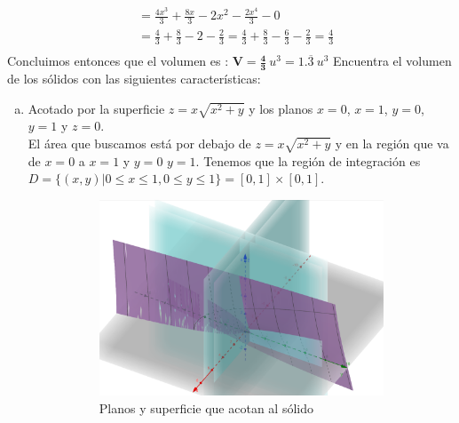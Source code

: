 \documentclass[12pt]{exam}
\begin{document}
\begin{questions}
\begin{align*}
      &= \frac{4x^3}{3}+ \frac{8x}{3}-2x^2-\frac{2x^4}{3} -0 \\
      &= \frac{4}{3}+ \frac{8}{3}-2-\frac{2}{3}=\frac{4}{3}+ \frac{8}{3}-\frac{6}{3}-\frac{2}{3} =\frac{4}{3} \\
    \end{align*}
Concluimos entonces que el volumen es : $ \boldsymbol{V = \frac{4}{3}} ~u^3 = 1.\overline{3}~u^3 $
     \question
       Encuentra el volumen de los sólidos con las siguientes características:
     \begin{enumerate}[a)]
     \item Acotado por la superficie $z=x\sqrt{x^2+y}$ y los planos $x=0$, $x=1$, $y=0$, $y=1$ y $z=0$.\\
       El área que buscamos está por debajo de $z=x\sqrt{x^2+y}$ y en la región que va de $x=0$ a $x=1$ y $y=0$ $y=1$.  Tenemos que la región de integración es $D=\{(x,y)|0 \leq x \leq 1, 0 \leq y \leq 1 \} =[0,1]\times[0,1]$.\\
      \begin{figure}[H]
    \centering
    \begin{subfigure}[b]{0.4\textwidth}
        \centering
        \includegraphics[width=\textwidth]{./img/i1e5.png}
        \caption{Planos y superficie que acotan al sólido}
        \label{fig:mapa1}
    \end{subfigure}
    \hfill
    \begin{subfigure}[b]{0.4\textwidth}
        \centering

\end{subfigure}
\end{figure}
\end{enumerate}
\end{questions}
\end{document}
